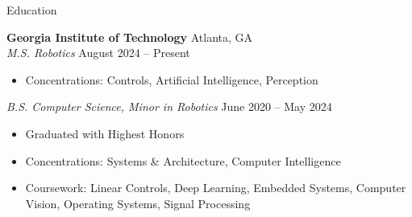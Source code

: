 \documentclass{resume} %
\begin{document}

\vspace{-0.5em}
\begin{rSection}{Education}

{\bf Georgia Institute of Technology} \hfill Atlanta, GA\\
\textit{M.S. Robotics} \hfill August 2024 -- Present
\vspace{-0.5em}
\begin{itemize}
   \itemsep -5pt {}
   \item Concentrations: Controls, Artificial Intelligence, Perception
\end{itemize}
\vspace{-0.5em}
\textit{B.S. Computer Science, Minor in Robotics} \hfill June 2020 -- May 2024
\vspace{-0.5em}
\begin{itemize}
   \itemsep -5pt {}
   \item Graduated with Highest Honors
   \item Concentrations: Systems \& Architecture, Computer Intelligence
   \item Coursework: Linear Controls, Deep Learning, Embedded Systems, Computer Vision, Operating Systems,
   Signal Processing
\end{itemize}

\end{rSection}

\end{document}
